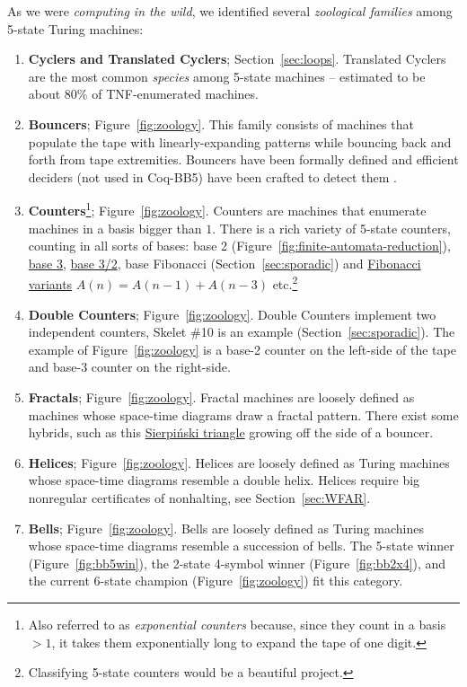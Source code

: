 \documentclass[a4paper,british]{article}
\theoremstyle{definition} %
\numberwithin{equation}{section}
\theoremstyle{definition} %
\newcommand{\CoqBB}{Coq-BB5\xspace}
\begin{document}
As we were \textit{computing in the wild}, we identified several \textit{zoological families} among 5-state Turing machines:

\begin{enumerate}
    \item \textbf{Cyclers and Translated Cyclers}; Section~\ref{sec:loops}. Translated Cyclers are the most common \textit{species} among 5-state machines -- estimated to be about 80\% of TNF-enumerated machines.
    \item \textbf{Bouncers}; Figure~\ref{fig:zoology}. This family consists of machines that populate the tape with linearly-expanding patterns while bouncing back and forth from tape extremities. Bouncers have been formally defined and efficient deciders (not used in \CoqBB) have been crafted to detect them \cite{bbchallenge_part1}.
    \item \textbf{Counters}\footnote{Also referred to as \textit{exponential counters} because, since they count in a basis $> 1$, it takes them exponentially long to expand the tape of one digit.}; Figure~\ref{fig:zoology}. Counters are machines that enumerate machines in a basis bigger than $1$. There is a rich variety of 5-state counters, counting in all sorts of bases: base 2 (Figure~\ref{fig:finite-automata-reduction}), \href{https://bbchallenge.org/1RB1RB_1RC0LD_1LD1RA_---1LE_0RA0LE }{base 3}, \href{https://bbchallenge.org/1LB1RC_0LE0RA_1LD1RA_0RA1LB_0RD0LB}{base 3/2}, base Fibonacci (Section~\ref{sec:sporadic}) and \href{https://bbchallenge.org/1RB1RA_0LC1LC_0RD1LD_0RA0LB}{Fibonacci variants} $A(n) = A(n-1) + A(n-3)$ etc.\footnote{Classifying 5-state counters would be a beautiful project.}
    \item \textbf{Double Counters}; Figure~\ref{fig:zoology}. Double Counters implement two independent counters, Skelet \#10 is an example (Section~\ref{sec:sporadic}). The example of Figure~\ref{fig:zoology} is a base-2 counter on the left-side of the tape and base-3 counter on the right-side.
    \item \textbf{Fractals}; Figure~\ref{fig:zoology}. Fractal machines are loosely defined as machines whose space-time diagrams draw a fractal pattern. There exist some hybrids, such as this \href{https://bbchallenge.org/1RB1RC_1RC1RB_1LD0RA_---1LE_0LD0LA&s=20000}{Sierpiński triangle} growing off the side of a bouncer.
    \item \textbf{Helices}; Figure~\ref{fig:zoology}. Helices are loosely defined as Turing machines whose space-time diagrams resemble a double helix. Helices require big nonregular certificates of nonhalting, see Section~\ref{sec:WFAR}.
    \item \textbf{Bells}; Figure~\ref{fig:zoology}. Bells are loosely defined as Turing machines whose space-time diagrams resemble a succession of bells. The 5-state winner (Figure~\ref{fig:bb5win}), the 2-state 4-symbol winner (Figure~\ref{fig:bb2x4}), and the current 6-state champion (Figure~\ref{fig:zoology}) fit this category.
\end{enumerate}
\end{document}
